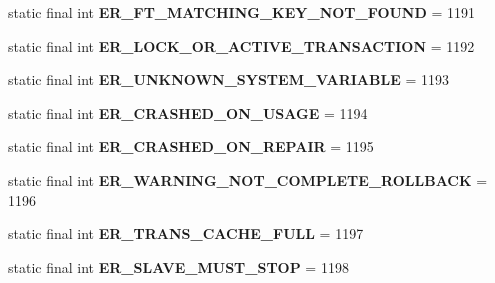 \begin{DoxyCompactItemize}
static final int {\bfseries E\+R\+\_\+\+F\+T\+\_\+\+M\+A\+T\+C\+H\+I\+N\+G\+\_\+\+K\+E\+Y\+\_\+\+N\+O\+T\+\_\+\+F\+O\+U\+ND} = 1191
\item 
\mbox{\label{classcom_1_1mysql_1_1jdbc_1_1_mysql_error_numbers_af28dc03ef1cb8f6ffd2e0ec33337a679}} 
static final int {\bfseries E\+R\+\_\+\+L\+O\+C\+K\+\_\+\+O\+R\+\_\+\+A\+C\+T\+I\+V\+E\+\_\+\+T\+R\+A\+N\+S\+A\+C\+T\+I\+ON} = 1192
\item 
\mbox{\label{classcom_1_1mysql_1_1jdbc_1_1_mysql_error_numbers_a029f9913d4b5bbc680842ca7e2156a5d}} 
static final int {\bfseries E\+R\+\_\+\+U\+N\+K\+N\+O\+W\+N\+\_\+\+S\+Y\+S\+T\+E\+M\+\_\+\+V\+A\+R\+I\+A\+B\+LE} = 1193
\item 
\mbox{\label{classcom_1_1mysql_1_1jdbc_1_1_mysql_error_numbers_adb75b7d8de16009581c1c01663366025}} 
static final int {\bfseries E\+R\+\_\+\+C\+R\+A\+S\+H\+E\+D\+\_\+\+O\+N\+\_\+\+U\+S\+A\+GE} = 1194
\item 
\mbox{\label{classcom_1_1mysql_1_1jdbc_1_1_mysql_error_numbers_abe3392d1fd896145681696b454ed758a}} 
static final int {\bfseries E\+R\+\_\+\+C\+R\+A\+S\+H\+E\+D\+\_\+\+O\+N\+\_\+\+R\+E\+P\+A\+IR} = 1195
\item 
\mbox{\label{classcom_1_1mysql_1_1jdbc_1_1_mysql_error_numbers_ae3468e3ac1f83f1f7e9344ee9017999f}} 
static final int {\bfseries E\+R\+\_\+\+W\+A\+R\+N\+I\+N\+G\+\_\+\+N\+O\+T\+\_\+\+C\+O\+M\+P\+L\+E\+T\+E\+\_\+\+R\+O\+L\+L\+B\+A\+CK} = 1196
\item 
\mbox{\label{classcom_1_1mysql_1_1jdbc_1_1_mysql_error_numbers_a435a6d30c64c166eb91ba8c37946c7fd}} 
static final int {\bfseries E\+R\+\_\+\+T\+R\+A\+N\+S\+\_\+\+C\+A\+C\+H\+E\+\_\+\+F\+U\+LL} = 1197
\item 
\mbox{\label{classcom_1_1mysql_1_1jdbc_1_1_mysql_error_numbers_a4be0b58301bd1b45d161f8686281cef9}} 
static final int {\bfseries E\+R\+\_\+\+S\+L\+A\+V\+E\+\_\+\+M\+U\+S\+T\+\_\+\+S\+T\+OP} = 1198

\end{DoxyCompactItemize}
